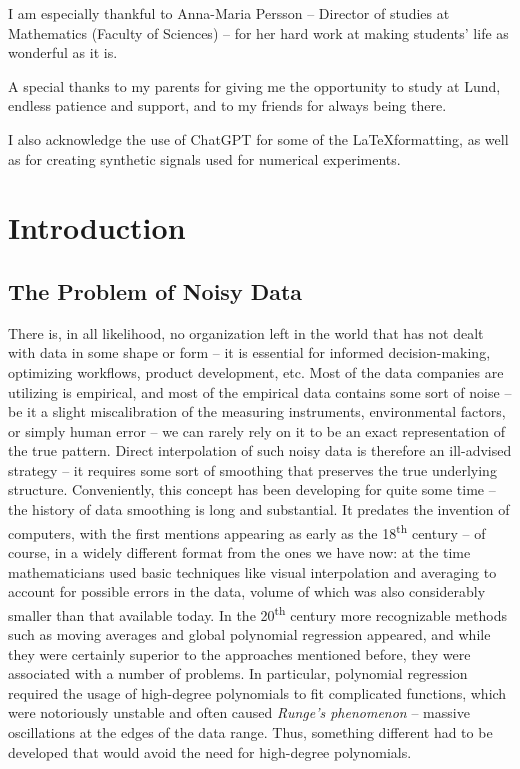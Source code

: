 \documentclass[11pt,leqno]{book}
\theoremstyle{definition}
\theoremstyle{plain}
\theoremstyle{definition}
\begin{document}
{\noindent I am especially thankful to Anna-Maria Persson -- Director of studies at Mathematics (Faculty of Sciences) -- for her hard work at making students' life as wonderful as it is.

\noindent A special thanks to my parents for giving me the opportunity to study at Lund, endless patience and support, and to my friends for always being there.

\noindent I also acknowledge the use of ChatGPT for some of the \LaTeX formatting, as well as for creating synthetic signals used for numerical experiments.


\tableofcontents


\newpage
\chapter{Introduction}
\section{The Problem of Noisy Data}
There is, in all likelihood, no organization left in the world that has not dealt with data in some shape or form -- it is essential for informed decision-making, optimizing workflows, product development, etc. Most of the data companies are utilizing is empirical, and most of the empirical data contains some sort of noise -- be it a slight miscalibration of the measuring instruments, environmental factors, or simply human error -- we can rarely rely on it to be an exact representation of the true pattern. Direct interpolation of such noisy data is therefore an ill-advised strategy -- it requires some sort of smoothing that preserves the true underlying structure. Conveniently, this concept has been developing for quite some time -- the history of data smoothing is long and substantial. It predates the invention of computers, with the first mentions appearing as early as the 18\textsuperscript{th} century \cite{smoothistory} -- of course, in a widely different format from the ones we have now: at the time mathematicians used basic techniques like visual interpolation and averaging to account for possible errors in the data, volume of which was also considerably smaller than that available today. In the 20\textsuperscript{th} century more recognizable methods such as moving averages and global polynomial regression appeared, and while they were certainly superior to the approaches mentioned before, they were associated with a number of problems. In particular, polynomial regression required the usage of high-degree polynomials to fit complicated functions, which were notoriously unstable and often caused \textit{Runge's phenomenon} -- massive oscillations at the edges of the data range. Thus, something different had to be developed that would avoid the need for high-degree polynomials.
}
\end{document}

